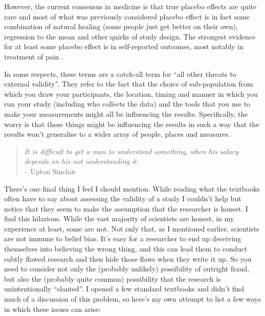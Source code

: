 However, the current consensus in medicine is that true placebo effects are quite rare and most of what was previously considered placebo effect is in fact some combination of natural healing (some people just get better on their own), regression to the mean and other quirks of study design. The strongest evidence for at least some placebo effect is in self-reported outcomes, most notably in treatment of pain \parencite{hrobjartsson2010}.

 
In some respects, these terms are a catch-all term for ``all other threats to external validity''. They refer to the fact that the choice of sub-population from which you draw your participants, the location, timing and manner in which you run your study (including who collects the data) and the tools that you use to make your measurements might all be influencing the results. Specifically, the worry is that these things might be influencing the results in such a way that the results won't generalise to a wider array of people, places and measures. 
 

\begin{quote}
{\it It is difficult to get a man to understand something, when his salary depends on his not understanding it.}\\
\hspace*{2cm}-- Upton Sinclair
\end{quote}

There's one final thing I feel I should mention. While reading what the textbooks often have to say about assessing the validity of a study I couldn't help but notice that they seem to  make the assumption that the researcher is honest. I find this hilarious. While the vast majority of scientists are honest, in my experience at least, some are not. Not only that, as I mentioned earlier, scientists are not immune to belief bias. It's easy for a researcher to end up deceiving themselves into believing the wrong thing, and this can lead them to conduct subtly flawed research and then hide those flaws when they write it up. So you need to consider not only the (probably unlikely) possibility of outright fraud, but also the (probably quite common) possibility that the research is unintentionally ``slanted''. I opened a few standard textbooks and didn't find much of a discussion of this problem, so here's my own attempt to list a few ways in which these issues can arise:

